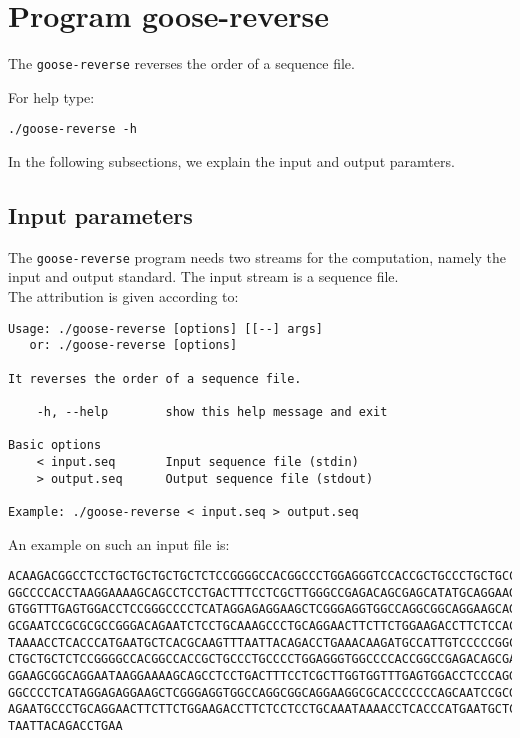 \section{Program goose-reverse}
The \texttt{goose-reverse} reverses the order of a sequence file.

For help type:
\begin{lstlisting}
./goose-reverse -h
\end{lstlisting}
In the following subsections, we explain the input and output paramters.

\subsection*{Input parameters}

The \texttt{goose-reverse} program needs two streams for the computation,
namely the input and output standard. The input stream is a sequence file.\\
The attribution is given according to:
\begin{lstlisting}
Usage: ./goose-reverse [options] [[--] args]
   or: ./goose-reverse [options]

It reverses the order of a sequence file.

    -h, --help        show this help message and exit

Basic options
    < input.seq       Input sequence file (stdin)
    > output.seq      Output sequence file (stdout)

Example: ./goose-reverse < input.seq > output.seq
\end{lstlisting}

An example on such an input file is:
\begin{lstlisting}
ACAAGACGGCCTCCTGCTGCTGCTGCTCTCCGGGGCCACGGCCCTGGAGGGTCCACCGCTGCCCTGCTGCCATTGTCCCC
GGCCCCACCTAAGGAAAAGCAGCCTCCTGACTTTCCTCGCTTGGGCCGAGACAGCGAGCATATGCAGGAAGCGGCAGGAA
GTGGTTTGAGTGGACCTCCGGGCCCCTCATAGGAGAGGAAGCTCGGGAGGTGGCCAGGCGGCAGGAAGCAGGCCAGTGCC
GCGAATCCGCGCGCCGGGACAGAATCTCCTGCAAAGCCCTGCAGGAACTTCTTCTGGAAGACCTTCTCCACCCCCCCAGC
TAAAACCTCACCCATGAATGCTCACGCAAGTTTAATTACAGACCTGAAACAAGATGCCATTGTCCCCCGGCCTCCTGCTG
CTGCTGCTCTCCGGGGCCACGGCCACCGCTGCCCTGCCCCTGGAGGGTGGCCCCACCGGCCGAGACAGCGAGCATATGCA
GGAAGCGGCAGGAATAAGGAAAAGCAGCCTCCTGACTTTCCTCGCTTGGTGGTTTGAGTGGACCTCCCAGGCCAGTGCCG
GGCCCCTCATAGGAGAGGAAGCTCGGGAGGTGGCCAGGCGGCAGGAAGGCGCACCCCCCCAGCAATCCGCGCGCCGGGAC
AGAATGCCCTGCAGGAACTTCTTCTGGAAGACCTTCTCCTCCTGCAAATAAAACCTCACCCATGAATGCTCACGCAAGTT
TAATTACAGACCTGAA
\end{lstlisting}

